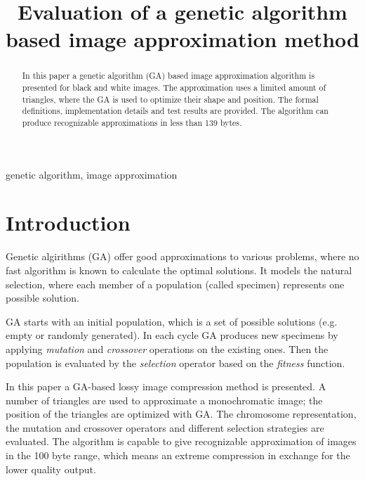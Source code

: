 \documentclass[conference]{IEEEtran}
\begin{document}
\title{Evaluation of a genetic algorithm based image approximation method}

\author{
}

\maketitle

\begin{abstract}
In this paper a genetic algorithm (GA) based image approximation
algorithm is presented for black and white images. The approximation
uses a limited amount of triangles, where the GA is used to
optimize their shape and position. The formal definitions,
implementation details and test results are provided. The
algorithm can produce recognizable approximations in less
than 139 bytes.
\end{abstract}

\begin{IEEEkeywords}
genetic algorithm, image approximation
\end{IEEEkeywords}

\section{Introduction}

Genetic algirithms (GA) \cite{ga-book} offer good
approximations to various
problems, where no fast algorithm is known to calculate
the optimal solutions. It models the natural selection,
where each member of a population (called specimen)
represents one possible solution.

GA starts with an initial population, which is a set of
possible solutions (e.g. empty or randomly generated).
In each cycle GA produces new specimens by applying
\emph{mutation} and \emph{crossover} operations on the
existing ones. Then the population is evaluated by
the \emph{selection} operator based on the \emph{fitness}
function.

In this paper a GA-based lossy image compression method is
presented. A number of triangles are used to approximate
a monochromatic image; the position of the triangles are
optimized with GA. The chromosome representation, the
mutation and crossover operators and different selection
strategies are evaluated. The algorithm is capable to give
recognizable approximation of images in the 100 byte range,
which means an extreme compression in exchange for the
lower quality output.
\end{document}
